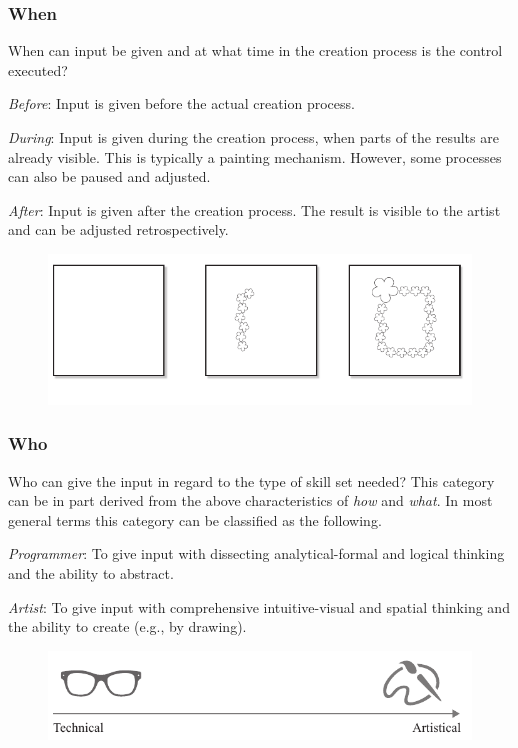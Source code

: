 \subsubsection{When}

When can input be given and at what time in the creation process is the control executed?

\textit{Before}: Input is given before the actual creation process.

\textit{During}: Input is given during the creation process, when parts of the results are already visible. This is typically a painting mechanism. However, some processes can also be paused and adjusted.

\textit{After}: Input is given after the creation process. The result is visible to the artist and can be adjusted retrospectively.

\begin{figure}[H]
    \centering
        \includegraphics[width=\controlParamsFigWidth\linewidth]{figures/control_paradigms/when.pdf}
\end{figure}


\subsubsection{Who}

Who can give the input in regard to the type of skill set needed? This category can be in part derived from the above characteristics of \textit{how} and \textit{what}. In most general terms this category can be classified as the following.


\textit{Programmer}: To give input with dissecting analytical-formal and logical thinking and the ability to abstract.

\textit{Artist}: To give input with comprehensive intuitive-visual and spatial thinking and the ability to create (e.g., by drawing).

\begin{figure}[H]
    \centering
        \includegraphics[width=\controlParamsFigWidth\linewidth]{figures/control_paradigms/who.pdf}
\end{figure}

